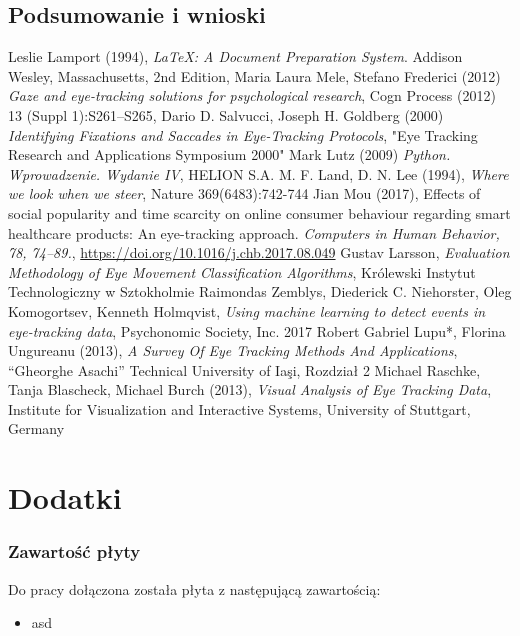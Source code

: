 \documentclass[14pt,a4paper,twoside,openright,titlepage]{extbook}
\begin{document}
    \chapter{Podsumowanie i wnioski}
        \blindtext
    \backmatter
    \fancyhf{}
    \pagestyle{plain}
    \renewcommand{\headrulewidth}{0pt}
    \begin{thebibliography}{99}
            Leslie Lamport (1994),
            \emph{\LaTeX: A Document Preparation System}.
            Addison Wesley, Massachusetts,
            2nd Edition,
            Maria Laura Mele, Stefano Frederici (2012)
            \emph{Gaze and eye-tracking solutions for psychological research},
            Cogn Process (2012) 13 (Suppl 1):S261–S265,
            Dario D. Salvucci, Joseph H. Goldberg (2000)
            \emph{Identifying Fixations and Saccades in Eye-Tracking Protocols},
            "Eye Tracking Research and Applications Symposium 2000"
            Mark Lutz (2009)
            \emph{Python. Wprowadzenie. Wydanie IV},
            HELION S.A.
            M. F. Land, D. N. Lee (1994),
            \emph{Where we look when we steer},
            Nature 369(6483):742-744
            Jian Mou (2017),
            Effects of social popularity and time scarcity on online consumer behaviour regarding smart healthcare products: An eye-tracking approach. \emph{Computers in Human Behavior, 78, 74–89.},
            \url{https://doi.org/10.1016/j.chb.2017.08.049}
            Gustav Larsson,
            \emph{Evaluation Methodology of Eye
            Movement Classification Algorithms},
            Królewski Instytut Technologiczny w Sztokholmie
            Raimondas Zemblys, Diederick C. Niehorster, Oleg Komogortsev, Kenneth Holmqvist,
            \emph{Using machine learning to detect events in eye-tracking data},
            Psychonomic Society, Inc. 2017
            Robert Gabriel Lupu*, Florina Ungureanu (2013),
            \emph{A Survey Of Eye Tracking Methods And Applications},
            “Gheorghe Asachi” Technical University of Iaşi,
            Rozdział 2
            Michael Raschke, Tanja Blascheck, Michael Burch (2013),
            \emph{Visual Analysis of Eye Tracking Data},
            Institute for Visualization and Interactive Systems, University of Stuttgart, Germany
    \end{thebibliography}
    \part*{Dodatki}
        \section*{Zawartość płyty}
            Do pracy dołączona została płyta z następującą zawartością:
            \begin{itemize}
                \item asd
            \end{itemize}
        \listoffigures
        \listoftables
        \lstlistoflistings
\end{document}
